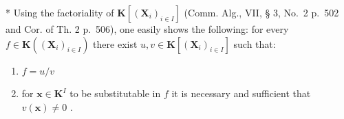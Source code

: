 * Using the factoriality of \(\mathbf{K}[(\mathbf{X}_i)_{i\in I}]\) (Comm. Alg., VII, § 3, No.~2 p.~502 and Cor. of Th. 2 p.~506), one easily shows the following: for every \(f\in \mathbf{K}((\mathbf{X}_i)_{i\in I})\) there exist \(u,v\in \mathbf{K}[(\mathbf{X}_i)_{i\in I}]\) such that:

\begin{enumerate}
\def\labelenumi{\arabic{enumi})}
\item
  \(f = u / v\)
\item
  for \(\mathbf{x} \in \mathbf{K}^{I}\) to be substitutable in \(f\) it is necessary and sufficient that \(v(\mathbf{x}) \neq 0\) .
\end{enumerate}

